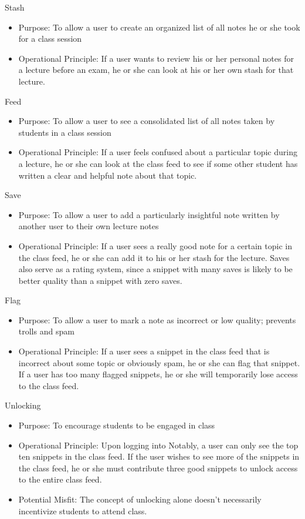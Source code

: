 \documentclass{article}
\begin{document}
Stash
\begin{itemize}
\item Purpose: To allow a user to create an organized list of all notes he or she took for a class session
\item Operational Principle: If a user wants to review his or her personal notes for a lecture before an exam, he or she can look at his or her own stash for that lecture.
\end{itemize}

Feed
\begin{itemize}
\item Purpose: To allow a user to see a consolidated list of all notes taken by students in a class session
\item Operational Principle: If a user feels confused about a particular topic during a lecture, he or she can look at the class feed to see if some other student has written a clear and helpful note about that topic.
\end{itemize}

Save
\begin{itemize}
\item Purpose: To allow a user to add a particularly insightful note written by another user to their own lecture notes
\item Operational Principle: If a user sees a really good note for a certain topic in the class feed, he or she can add it to his or her stash for the lecture. Saves also serve as a rating system, since a snippet with many saves is likely to be better quality than a snippet with zero saves.
\end{itemize}

Flag
\begin{itemize}
\item Purpose: To allow a user to mark a note as incorrect or low quality; prevents trolls and spam
\item Operational Principle: If a user sees a snippet in the class feed that is incorrect about some topic or obviously spam, he or she can flag that snippet. If a user has too many flagged snippets, he or she will temporarily lose access to the class feed.
\end{itemize}

Unlocking
\begin{itemize}
\item Purpose: To encourage students to be engaged in class
\item Operational Principle: Upon logging into Notably, a user can only see the top ten snippets in the class feed. If the user wishes to see more of the snippets in the class feed, he or she must contribute three good snippets to unlock access to the entire class feed.
\item Potential Misfit: The concept of unlocking alone doesn't necessarily incentivize students to attend class.
\end{itemize}
\end{document}
